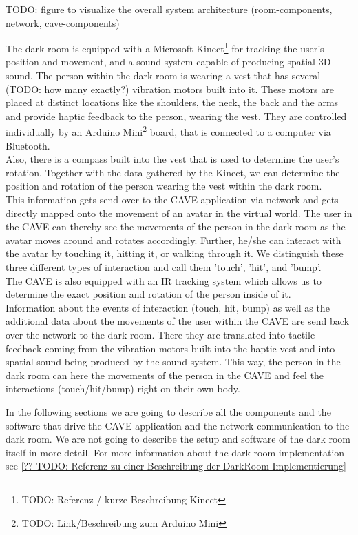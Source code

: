\documentclass[conference]{acmsiggraph}
\begin{document}
TODO: figure to visualize the overall system architecture (room-components, network, cave-components)

The dark room is equipped with a Microsoft Kinect\footnote{TODO: Referenz / kurze Beschreibung Kinect} for tracking the user's position and movement, and a sound system capable of producing spatial 3D-sound. The person within the dark room is wearing a vest that has several (TODO: how many exactly?) vibration motors built into it. These motors are placed at distinct locations like the shoulders, the neck, the back and the arms and provide haptic feedback to the person, wearing the vest. They are controlled individually by an Arduino Mini\footnote{TODO: Link/Beschreibung zum Arduino Mini} board, that is connected to a computer via Bluetooth.\\
Also, there is a compass built into the vest that is used to determine the user's rotation. Together with the data gathered by the Kinect, we can determine the position and rotation of the person wearing the vest within the dark room.\\
This information gets send over to the CAVE-application via network and gets directly mapped onto the movement of an avatar in the virtual world. The user in the CAVE can thereby see the movements of the person in the dark room as the avatar moves around and rotates accordingly. Further, he/she can interact with the avatar by touching it, hitting it, or walking through it. We distinguish these three different types of interaction and call them 'touch', 'hit', and 'bump'.\\
The CAVE is also equipped with an IR tracking system which allows us to determine the exact position and rotation of the person inside of it.\\
Information about the events of interaction (touch, hit, bump) as well as the additional data about the movements of the user within the CAVE are send back over the network to the dark room. There they are translated into tactile feedback coming from the vibration motors built into the haptic vest and into spatial sound being produced by the sound system.
This way, the person in the dark room can here the movements of the person in the CAVE and feel the interactions (touch/hit/bump) right on their own body.

In the following sections we are going to describe all the components and the software that drive the CAVE application and the network communication to the dark room. We are not going to describe the setup and software of the dark room itself in more detail. For more information about the dark room implementation see \ref{?? TODO: Referenz zu einer Beschreibung der DarkRoom Implementierung}
\end{document}
